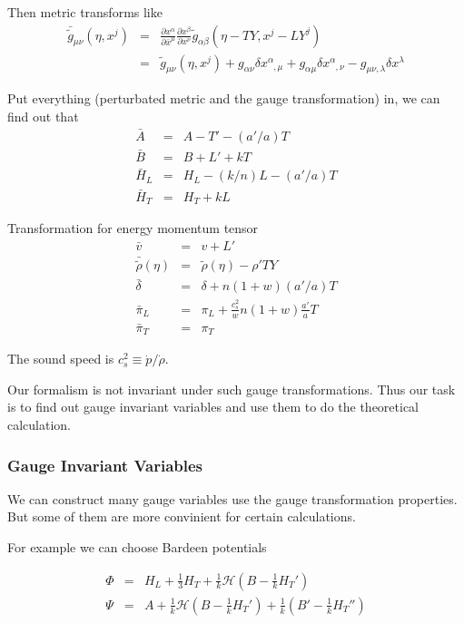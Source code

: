 \documentclass[12pt,a4paper]{book}
\begin{document}
Then metric transforms like
\begin{eqnarray}
	\bar{\tilde g} _{\mu\nu}(\eta,x^j) &=& \frac{\partial x^\alpha}{\partial{\bar x^\mu}} \frac{\partial x^\beta }{\partial x^\nu} \tilde g_{\alpha\beta}(\eta-T Y, x^j - L Y^j)  \\
	&=& \tilde g_{\mu\nu}(\eta,x^j) + g_{\alpha\nu}\delta x^\alpha_{\phantom\alpha,\mu} + g_{\alpha\mu}\delta x^{\alpha}_{\phantom \alpha,\nu} - g_{\mu\nu,\lambda}\delta x^\lambda
\end{eqnarray}


Put everything (perturbated metric and the gauge transformation) in, we can find out that
\begin{eqnarray}
	\bar A&=& A- T' - (a'/a)T \\
	\bar B&=& B+L' + k T \\
	\bar H_L &=& H_L - (k/n) L - (a'/a)T \\
	\bar H_T &=& H_T + k L 
\end{eqnarray}

Transformation for energy momentum tensor
\begin{eqnarray}
	\bar v &=& v +L' \\
	\bar{\tilde \rho}(\eta) &=& \tilde \rho(\eta) - \rho' T Y \\
	\bar \delta &=& \delta + n(1+w)(a'/a) T   \\
	\bar \pi_L &=& \pi_L + \frac{c_s^2}{w} n(1+w)\frac{a'}{a} T \\
	\bar \pi_T &=& \pi_T
\end{eqnarray}

The sound speed is $c_s^2\equiv \dot p/\dot \rho$.

Our formalism is not invariant under such gauge transformations. Thus our task is to find out gauge invariant variables and use them to do the theoretical calculation.



\subsubsection{Gauge Invariant Variables}

We can construct many gauge variables use the gauge transformation properties. But some of them are more convinient for certain calculations.

For example we can choose Bardeen potentials

\begin{eqnarray}
	\Phi &=& H_L + \frac13 H_T + \frac1k \mathcal H (B - \frac{1}{k}H_T' ) \\
	\Psi &=& A + \frac 1 k \mathcal H (B - \frac{1}{k}H_T'  ) + \frac{1}{k}  (B' - \frac1k H_T '')
\end{eqnarray}
\end{document}
